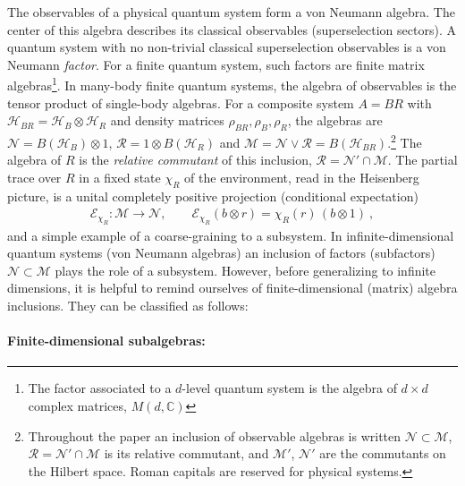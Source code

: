 \documentclass[a4paper,11pt]{article}
\theoremstyle{definition}
\newcommand{\mR}{\mathcal{R}}
\newcommand{\mN}{\mathcal{N}}
\newcommand{\mM}{\mathcal{M}}
\newcommand{\mE}{\mathcal{E}}
\begin{document}
The observables of a physical quantum system form a von Neumann algebra. The center of this algebra describes its classical observables (superselection sectors). A quantum system with no non-trivial classical superselection observables is a von Neumann \emph{factor}. For a finite quantum system, such factors are
finite matrix algebras\footnote{The factor associated to a $d$-level quantum system is the algebra of $d\times d$ complex matrices, $M(d,\mathbb{C})$}. In many-body finite quantum systems, the algebra of observables is the tensor product of single-body algebras. For a composite system $A=BR$ with $\mathcal H_{BR}=\mathcal H_B\otimes\mathcal H_R$ and density matrices $\rho_{BR},\rho_B,\rho_R$, the algebras are $\mN=B(\mathcal H_B)\otimes1$, $\mR=1\otimes B(\mathcal H_R)$ and $\mM=\mN\vee\mR=B(\mathcal H_{BR})$.\footnote{Throughout the paper an inclusion of observable algebras is written $\mN\subset\mM$, $\mR=\mN'\cap\mM$ is its relative commutant, and $\mM'$, $\mN'$ are the commutants on the Hilbert space. Roman capitals are reserved for physical systems.} 
The algebra of $R$ is the \emph{relative commutant} of this inclusion, $\mR=\mN'\cap\mM$.
The partial trace over $R$ in a fixed state $\chi_R$ of the environment, read in the Heisenberg picture, is a unital completely positive projection (conditional expectation)
\begin{align}
    \mE_{\chi_R}:\mM\to\mN,\qquad
    \mE_{\chi_R}(b\otimes r)=\chi_R(r)\,(b\otimes 1)\ ,
    \label{eq:slice-expectation-intro}
\end{align}
and a simple example of a coarse-graining to a subsystem. In infinite-dimensional quantum systems (von Neumann algebras) an inclusion of factors (subfactors) $\mN\subset\mM$ plays the role of a subsystem. However, before generalizing to infinite dimensions, it is helpful to remind ourselves of finite-dimensional (matrix) algebra inclusions. They can be classified as follows:

\paragraph{Finite-dimensional subalgebras:}\label{app:finite-coarse}
\end{document}
